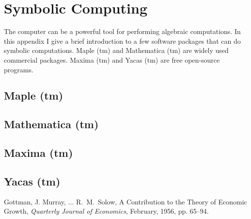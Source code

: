 \documentclass{book}
\begin{document}
\chapter{Symbolic Computing}
The computer can be a powerful tool for performing
algebraic computations.  In this appendix I give a brief introduction
to a few software packages that can do symbolic computations.
Maple (tm) and Mathematica (tm) are widely used commercial
packages.  Maxima (tm) and Yacas (tm) are free open-source
programs.
\section{Maple (tm)}
\section{Mathematica (tm)}
\section{Maxima (tm)}
\section{Yacas (tm)}
%
\begin{thebibliography}{99}
 Gottman, J. Murray, ...
R.~M.~Solow, A Contribution to the Theory of Economic Growth,
\emph{Quarterly Journal of Economics}, February, 1956, pp. 65--94.
\end{thebibliography}
\printindex
\end{document}
